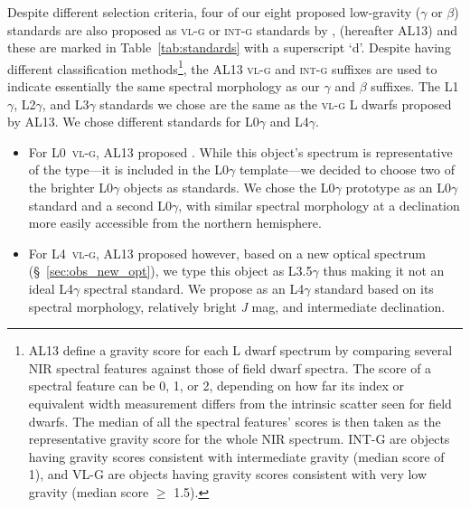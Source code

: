 \documentclass[modern]{aastex61}
\begin{document}
Despite different selection criteria, four of our eight proposed low-gravity ($\gamma$ or $\beta$) standards are also proposed as \textsc{vl-g} or \textsc{int-g} standards by \citet{Allers:2013hk}, (hereafter AL13) and these are marked in Table~\ref{tab:standards} with a superscript `d'.
Despite having different classification methods\footnote{AL13 define a gravity score for each L dwarf spectrum by comparing several NIR spectral features against those of field dwarf spectra. The score of a spectral feature can be 0, 1, or 2, depending on how far its index or equivalent width measurement differs from the intrinsic scatter seen for field dwarfs. The median of all the spectral features' scores is then taken as the representative gravity score for the whole NIR spectrum. INT-G are objects having gravity scores consistent with intermediate gravity (median score of 1), and VL-G are objects having gravity scores consistent with very low gravity (median score $\geq$ 1.5).}, the AL13 \textsc{vl-g} and \textsc{int-g} suffixes are used to indicate essentially the same spectral morphology as our $\gamma$ and $\beta$ suffixes.
The L1$\gamma$, L2$\gamma$, and L3$\gamma$ standards we chose are the same as the \textsc{vl-g} L dwarfs proposed by AL13.
We chose different standards for L0$\gamma$ and L4$\gamma$.
\begin{itemize}

  \item For L0~\textsc{vl-g}, AL13 proposed . While this object's spectrum is representative of the type---it is included in the L0$\gamma$ template---we decided to choose two of the brighter L0$\gamma$ objects as standards. We chose the L0$\gamma$ prototype  as an L0$\gamma$ standard and a second L0$\gamma$,  with similar spectral morphology at a declination more easily accessible from the northern hemisphere.

  \item For L4~\textsc{vl-g}, AL13 proposed  however, based on a new optical spectrum (\S~\ref{sec:obs_new_opt}), we type this object as L3.5$\gamma$ thus making it not an ideal L4$\gamma$ spectral standard.
  We propose  as an L4$\gamma$ standard based on its spectral morphology, relatively bright \emph{J} mag, and intermediate declination.

\end{itemize}
\end{document}
